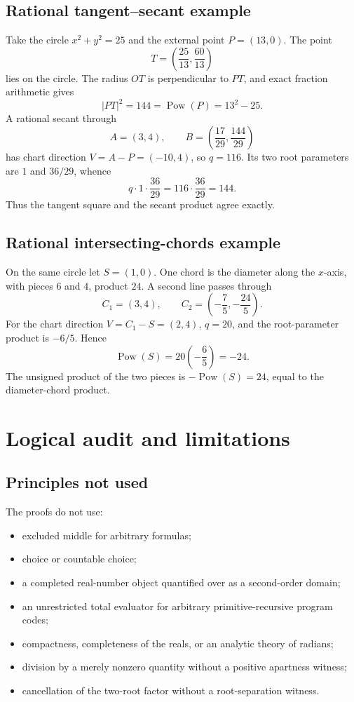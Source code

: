\documentclass[11pt,letterpaper]{article}
\theoremstyle{definition}
\theoremstyle{remark}
\newcommand{\Pow}{\operatorname{Pow}}
\begin{document}
\subsection{Rational tangent--secant example}

Take the circle \(x^2+y^2=25\) and the external point \(P=(13,0)\).  The point
\[
 T=\left(\frac{25}{13},\frac{60}{13}\right)
\]
lies on the circle.  The radius \(OT\) is perpendicular to \(PT\), and exact
fraction arithmetic gives
\[
 |PT|^2=144=\Pow(P)=13^2-25.
\]
A rational secant through
\[
 A=(3,4),
 \qquad
 B=\left(\frac{17}{29},\frac{144}{29}\right)
\]
has chart direction \(V=A-P=(-10,4)\), so \(q=116\).  Its two root parameters
are \(1\) and \(36/29\), whence
\[
 q\cdot1\cdot\frac{36}{29}=116\cdot\frac{36}{29}=144.
\]
Thus the tangent square and the secant product agree exactly.

\subsection{Rational intersecting-chords example}

On the same circle let \(S=(1,0)\).  One chord is the diameter along the
\(x\)-axis, with pieces \(6\) and \(4\), product \(24\).  A second line passes
through
\[
 C_1=(3,4),
 \qquad
 C_2=\left(-\frac75,-\frac{24}{5}\right).
\]
For the chart direction \(V=C_1-S=(2,4)\), \(q=20\), and the root-parameter
product is \(-6/5\).  Hence
\[
 \Pow(S)=20\left(-\frac65\right)=-24.
\]
The unsigned product of the two pieces is \(-\Pow(S)=24\), equal to the
diameter-chord product.

\section{Logical audit and limitations}
\label{sec:audit}

\subsection{Principles not used}

The proofs do not use:
\begin{itemize}
\item excluded middle for arbitrary formulas;
\item choice or countable choice;
\item a completed real-number object quantified over as a second-order domain;
\item an unrestricted total evaluator for arbitrary primitive-recursive program
codes;
\item compactness, completeness of the reals, or an analytic theory of radians;
\item division by a merely nonzero quantity without a positive apartness
witness;
\item cancellation of the two-root factor without a root-separation witness.
\end{itemize}
\end{document}
